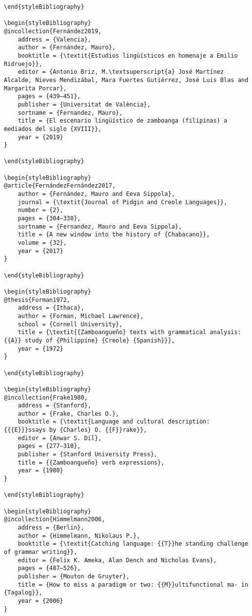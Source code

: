 \documentclass[output=paper]{langsci/langscibook}
\begin{document}
\begin{stylelsUnNumberedSection}
\begin{verbatim}
\end{styleBibliography}

\begin{styleBibliography}
@incollection{Fernández2019,
	address = {Valencia},
	author = {Fernández, Mauro},
	booktitle = {\textit{Estudios lingüísticos en homenaje a Emilio Ridruejo}},
	editor = {Antonio Briz, M.\textsuperscript{a} José Martínez Alcalde, Nieves Mendizábal, Mara Fuertes Gutiérrez, José Luis Blas and Margarita Porcar},
	pages = {439–451},
	publisher = {Universitat de València},
	sortname = {Fernandez, Mauro},
	title = {El escenario lingüístico de zamboanga (filipinas) a mediados del siglo {XVIII}},
	year = {2019}
}

\end{styleBibliography}

\begin{styleBibliography}
@article{FernándezFernández2017,
	author = {Fernández, Mauro and Eeva Sippola},
	journal = {\textit{Journal of Pidgin and Creole Languages}},
	number = {2},
	pages = {304–338},
	sortname = {Fernandez, Mauro and Eeva Sippola},
	title = {A new window into the history of {Chabacano}},
	volume = {32},
	year = {2017}
}

\end{styleBibliography}

\begin{styleBibliography}
@thesis{Forman1972,
	address = {Ithaca},
	author = {Forman, Michael Lawrence},
	school = {Cornell University},
	title = {\textit{{Zamboangueño} texts with grammatical analysis: {{A}} study of {Philippine} {Creole} {Spanish}}},
	year = {1972}
}

\end{styleBibliography}

\begin{styleBibliography}
@incollection{Frake1980,
	address = {Stanford},
	author = {Frake, Charles O.},
	booktitle = {\textit{Language and cultural description: {{{E}}}ssays by {Charles} O. {{F}}rake}},
	editor = {Anwar S. Dil},
	pages = {277–310},
	publisher = {Stanford University Press},
	title = {{Zamboangueño} verb expressions},
	year = {1980}
}

\end{styleBibliography}

\begin{styleBibliography}
@incollection{Himmelmann2006,
	address = {Berlin},
	author = {Himmelmann, Nikolaus P.},
	booktitle = {\textit{Catching language: {{T}}he standing challenge of grammar writing}},
	editor = {Felix K. Ameka, Alan Dench and Nicholas Evans},
	pages = {487–526},
	publisher = {Mouton de Gruyter},
	title = {How to miss a paradigm or two: {{M}}ultifunctional ma- in {Tagalog}},
	year = {2006}
}


\end{verbatim}
\end{stylelsUnNumberedSection}
\end{document}
